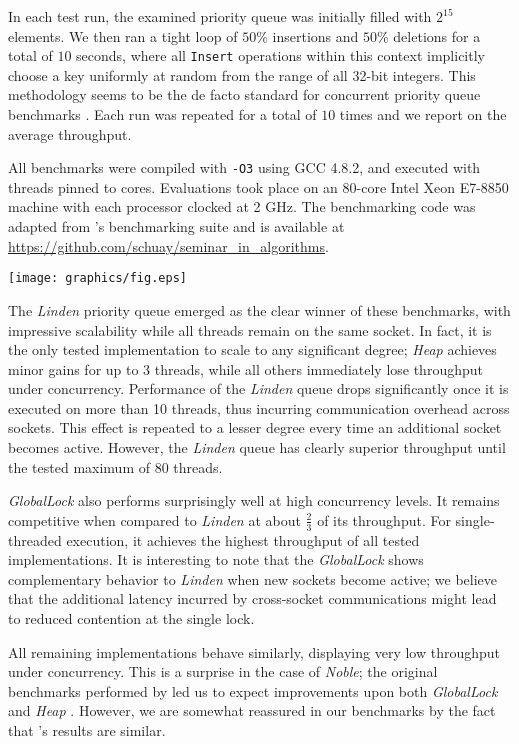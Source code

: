 In each test run, the examined priority queue was initially filled with $2^{15}$
elements. We then ran a tight loop of $50\%$ insertions and $50\%$ deletions
for a total of $10$ seconds, where all \lstinline|Insert|
operations within this context implicitly choose a key uniformly at random from
the range of all 32-bit integers. This methodology seems to be the de facto standard for concurrent
priority queue benchmarks
\cite{alistarhspraylist,linden2013skiplist,shavit2000skiplist,sundell2003fast}.
Each run was repeated for a total of $10$ times
and we report on the average throughput.

All benchmarks were compiled with \verb|-O3| using GCC 4.8.2, and executed with threads pinned to
cores. Evaluations took place
on an 80-core Intel Xeon E7-8850 machine with each processor clocked at 2 GHz.
The benchmarking code was adapted from \citeauthor{linden2013skiplist}'s
benchmarking suite and is available at \url{https://github.com/schuay/seminar_in_algorithms}.

\begin{center}
\texttt{[image: graphics/fig.eps]}\end{center}

The \textit{Linden} priority queue emerged as the clear winner of these benchmarks,
with impressive scalability while all threads remain on the same socket. In fact, it is the only
tested implementation to scale to any significant degree; \textit{Heap} achieves minor gains
for up to 3 threads, while all others immediately lose throughput under concurrency.
Performance of the \textit{Linden} queue drops significantly once it is executed on more than 10
threads, thus incurring communication overhead across sockets. This effect is repeated to a lesser
degree every time an additional socket becomes active. However, the \textit{Linden} queue has
clearly superior throughput until the tested maximum of 80 threads.

\textit{GlobalLock} also performs surprisingly well at high concurrency levels.
It remains competitive when compared to \textit{Linden} at about $\frac{2}{3}$ of its throughput.
For single-threaded execution, it achieves the highest throughput of all tested implementations.
It is interesting to note that the \textit{GlobalLock} shows complementary behavior to
\textit{Linden} when new sockets become active; we believe that the additional latency incurred
by cross-socket communications might lead to reduced contention at the single lock.

All remaining implementations behave similarly, displaying very low throughput under concurrency.
This is a surprise in the case of \textit{Noble}; the original benchmarks performed by
\citeauthor{sundell2003fast} led us to expect improvements upon both \textit{GlobalLock}
and \textit{Heap} \cite{sundell2003fast}. However, we are somewhat reassured in our benchmarks by
the fact that \citeauthor{linden2013skiplist}'s results are similar.

